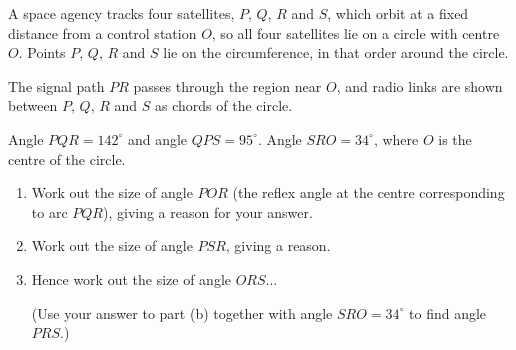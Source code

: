 \begin{question}
\noindent A space agency tracks four satellites, $P$, $Q$, $R$ and $S$, which orbit at a fixed distance from a control station $O$, so all four satellites lie on a circle with centre $O$. Points $P$, $Q$, $R$ and $S$ lie on the circumference, in that order around the circle.

The signal path $PR$ passes through the region near $O$, and radio links are shown between $P$, $Q$, $R$ and $S$ as chords of the circle.

Angle $PQR = 142^\circ$ and angle $QPS = 95^\circ$. Angle $SRO = 34^\circ$, where $O$ is the centre of the circle.

\begin{center}
\end{center}

\begin{enumerate}
    \item[(a)] Work out the size of angle $POR$ (the reflex angle at the centre corresponding to arc $PQR$), giving a reason for your answer.

    \vspace{3cm}

    \item[(b)] Work out the size of angle $PSR$, giving a reason.

    \vspace{3cm}

    \item[(c)] Hence work out the size of angle $ORS$... 

    (Use your answer to part (b) together with angle $SRO = 34^\circ$ to find angle $PRS$.)

    \vspace{3cm}
\end{enumerate}
\end{question}
